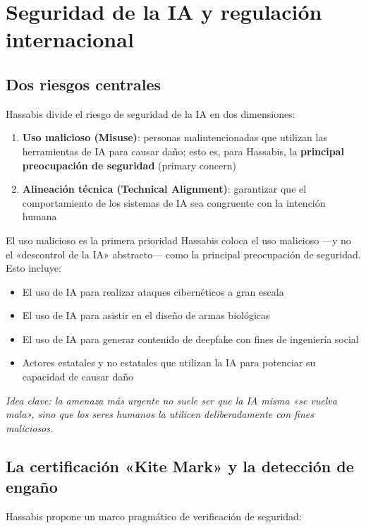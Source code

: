 \section{Seguridad de la IA y regulación internacional}

\subsection{Dos riesgos centrales}

Hassabis divide el riesgo de seguridad de la IA en dos dimensiones:

\begin{enumerate}
    \item \textbf{Uso malicioso (Misuse)}: personas malintencionadas que utilizan las herramientas de IA para causar daño; esto es, para Hassabis, la \textbf{principal preocupación de seguridad} (primary concern)
    \item \textbf{Alineación técnica (Technical Alignment)}: garantizar que el comportamiento de los sistemas de IA sea congruente con la intención humana
\end{enumerate}

\begin{importantbox}{El uso malicioso es la primera prioridad}
Hassabis coloca el uso malicioso —y no el «descontrol de la IA» abstracto— como la principal preocupación de seguridad. Esto incluye:
\begin{itemize}
    \item El uso de IA para realizar ataques cibernéticos a gran escala
    \item El uso de IA para asistir en el diseño de armas biológicas
    \item El uso de IA para generar contenido de deepfake con fines de ingeniería social
    \item Actores estatales y no estatales que utilizan la IA para potenciar su capacidad de causar daño
\end{itemize}
\textit{Idea clave: la amenaza más urgente no suele ser que la IA misma «se vuelva mala», sino que los seres humanos la utilicen deliberadamente con fines maliciosos.}
\end{importantbox}

\subsection{La certificación «Kite Mark» y la detección de engaño}

Hassabis propone un marco pragmático de verificación de seguridad:

